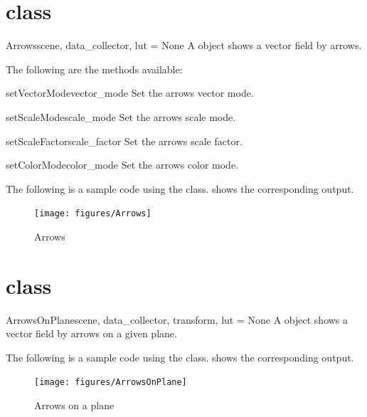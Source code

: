 \section{\Arrows class}
\begin{classdesc}{Arrows}{scene, data_collector, lut = None}
A \Arrows object shows a vector field by arrows.
\end{classdesc}

The following are the methods available:
\begin{methoddesc}[Arrows]{setVectorMode}{vector_mode}
Set the arrows vector mode.
\end{methoddesc}

\begin{methoddesc}[Arrows]{setScaleMode}{scale_mode}
Set the arrows scale mode.
\end{methoddesc}

\begin{methoddesc}[Arrows]{setScaleFactor}{scale_factor}
Set the arrows scale factor.
\end{methoddesc}

\begin{methoddesc}[Arrows]{setColorMode}{color_mode}
Set the arrows color mode.
\end{methoddesc}

The following is a sample code using the \Arrows class. 
 shows the corresponding output. 


\begin{figure}[ht]
\begin{center}
\texttt{[image: figures/Arrows]}
\end{center}
\caption{Arrows}
\label{fig:arrows.1}
\end{figure}

\section{\ArrowsOnPlane class}
\begin{classdesc}{ArrowsOnPlane}{scene, data_collector, transform, lut = None}
A \ArrowsOnPlane object shows a vector field by arrows on a given plane.
\end{classdesc}

The following is a sample code using the \ArrowsOnPlane class. 
 shows the corresponding output. 


\begin{figure}[ht]
\begin{center}
\texttt{[image: figures/ArrowsOnPlane]}
\end{center}
\caption{Arrows on a plane}
\label{fig:arrowsonplane.1}
\end{figure}

